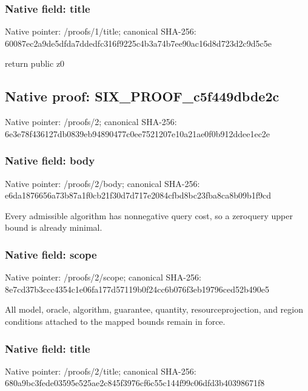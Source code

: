 \documentclass[10pt,a4paper]{article}
\begin{document}
\subsubsection{Native field: title}


Native pointer: /proofs/1/title; canonical SHA-256: 60087ec2a9de5dfda7ddedfc\allowbreak{}316f9225c4b3a74b7ee90ac1\allowbreak{}6d8d723d2c9d5c5e


return public z0


\subsection{Native proof: SIX\_PROOF\_c5f449dbde2c}


Native pointer: /proofs/2; canonical SHA-256: 6e3e78f436127db0839eb948\allowbreak{}90477c0ee7521207e10a21ae\allowbreak{}0f0b912ddee1ec2e



\subsubsection{Native field: body}


Native pointer: /proofs/2/body; canonical SHA-256: e6da1876656a73b87a1f0cb2\allowbreak{}1f30d7d717e2084cfbd8bc23\allowbreak{}fba8ca8b09b1f9cd


Every admissible algorithm has nonnegative query cost, so a zeroquery upper bound is already minimal.


\subsubsection{Native field: scope}


Native pointer: /proofs/2/scope; canonical SHA-256: 8e7cd37b3ccc4354c1e06fa1\allowbreak{}77d57119b0f24cc6b076f3eb\allowbreak{}19796ced52b490e5


All model, oracle, algorithm, guarantee, quantity, resourceprojection, and region conditions attached to the mapped bounds remain in force.


\subsubsection{Native field: title}


Native pointer: /proofs/2/title; canonical SHA-256: 680a9bc3fede03595e525ae2\allowbreak{}c845f3976cf6c55c144f99c0\allowbreak{}6dfd3b40398671f8
\end{document}
